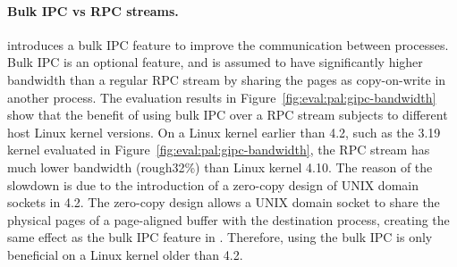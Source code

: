 \paragraph{Bulk IPC vs RPC streams.}
\Thehostabi{} introduces a bulk IPC feature to improve the communication between processes.
Bulk IPC
is an optional feature,
and is assumed to have significantly higher bandwidth
than a regular RPC stream
by sharing the pages as copy-on-write
in another process.
The evaluation results
in Figure~\ref{fig:eval:pal:gipc-bandwidth}
show that
the benefit of using bulk IPC over a RPC stream
subjects to different
host Linux kernel versions.
On a Linux kernel earlier than 4.2, such as the 3.19 kernel evaluated in Figure~\ref{fig:eval:pal:gipc-bandwidth},
the RPC stream
has much lower bandwidth (rough{}32\%) than Linux kernel 4.10.
The reason of the slowdown
is due to the introduction of a zero-copy design of UNIX domain sockets in 4.2.
The zero-copy design
allows a UNIX domain socket to share the physical pages
of a page-aligned buffer
with the destination process,
creating the same effect as the bulk IPC feature in \thehostabi{}.
Therefore, using the bulk IPC is only beneficial on a Linux kernel older than 4.2.






 




